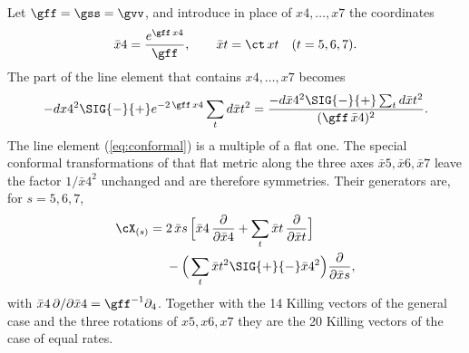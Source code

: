 Let $\gff=\gss=\gvv$, and introduce in place of $x4,\dots,x7$ the coordinates
\begin{equation}
\bar x4=\frac{e^{\gff\,x4}}{\gff},\qquad\bar xt=\ct\,xt\quad(t=5,6,7).
\end{equation}
The part of the line element that contains $x4,\dots,x7$ becomes
\begin{equation}
-dx4^{2}\SIG{-}{+}e^{-2\,\gff\,x4}\sum_t d\bar xt^{2}
=\frac{-d\bar x4^{2}\SIG{-}{+}\sum_t d\bar xt^{2}}{(\gff\,\bar x4)^{2}} .
\label{eq:conformal}
\end{equation}
 The line element (\ref{eq:conformal}) is a multiple of a flat one. The
special conformal transformations of that flat metric along the three axes $\bar x5,\bar x6,\bar x7$
leave the factor $1/\bar x4^{2}$ unchanged and are therefore symmetries. Their generators are, for
$s=5,6,7$,
\begin{equation}
\begin{aligned}
\cX_{(s)}={}&2\,\bar xs\,\Big[\bar x4\,\frac{\partial}{\partial\bar x4}+\sum_t\bar xt\,\frac{\partial}{\partial\bar xt}\Big]\\
&-\Big(\sum_t\bar xt^{2}\SIG{+}{-}\bar x4^{2}\Big)\frac{\partial}{\partial\bar xs},
\end{aligned}
\label{eq:special}
\end{equation}
with $\bar x4\,\partial/\partial\bar x4=\gff^{-1}\partial_4$. Together with the 14 Killing vectors of
the general case and the three rotations of $x5,x6,x7$ they are the 20 Killing vectors of the case
of equal rates.

